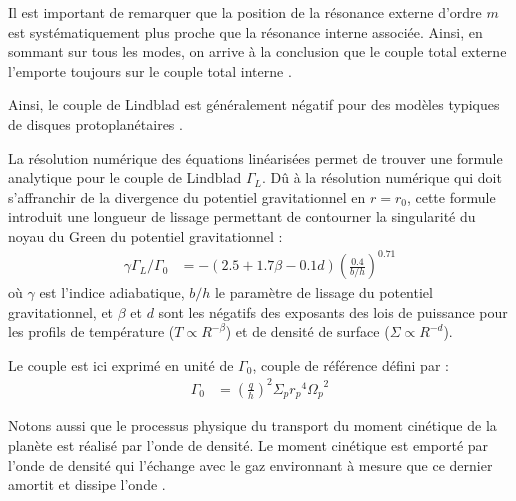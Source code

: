 \bigskip

Il est important de remarquer que la position de la résonance externe d'ordre $m$ est systématiquement plus proche que la résonance interne associée. Ainsi, en sommant sur tous les modes, on arrive à la conclusion que le couple total externe l'emporte toujours sur le couple total interne \citep{ward1997protoplanet}. 

Ainsi, le couple de Lindblad est généralement négatif pour des modèles typiques de disques protoplanétaires \citep{ward1997protoplanet}.

La résolution numérique des équations linéarisées permet de trouver une formule analytique pour le couple de Lindblad $\Gamma_L$. Dû à la résolution numérique qui doit s'affranchir de la divergence du potentiel gravitationnel en $r=r_0$, cette formule introduit une longueur de lissage permettant de contourner la singularité du noyau du Green du potentiel gravitationnel \citep[eq. (14)]{paardekooper2010torque} : 
\begin{align}
\gamma \Gamma_L/\Gamma_0 &= - \left(2.5 +1.7\beta -0.1d\right) \left(\frac{0.4}{b/h}\right)^{0.71}\label{eq:lindblad-torque}
\end{align}
où $\gamma$ est l'indice adiabatique, $b/h$ le paramètre de lissage du potentiel gravitationnel, et $\beta$ et $d$ sont les négatifs des exposants des lois de puissance pour les profils de température ($T \propto R^{-\beta}$) et de densité de surface ($\Sigma \propto R^{-d}$). 

Le couple est ici exprimé en unité de $\Gamma_0$, couple de référence défini par : 
\begin{align}
\Gamma_0 &= \left(\frac{q}{h}\right)^2\Sigma_p {r_p}^4 {\Omega_p}^2
\end{align}

Notons aussi que le processus physique du transport du moment cinétique de la planète est réalisé par l'onde de densité. Le
moment cinétique est emporté par l'onde de densité qui l'échange avec le gaz environnant à mesure que ce dernier amortit et
dissipe l'onde \citep{crida2006width}.

